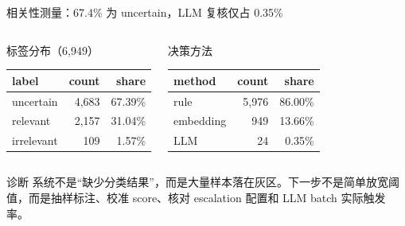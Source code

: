 \begin{frame}{相关性测量：67.4\% 为 uncertain，LLM 复核仅占 0.35\%}
\small
\begin{columns}[T,onlytextwidth]
\begin{block}{标签分布（6,949）}
\begin{tabularx}{0.96\linewidth}{X r r}
\toprule
label & count & share \\
\midrule
uncertain & 4,683 & 67.39\% \\
relevant & 2,157 & 31.04\% \\
irrelevant & 109 & 1.57\% \\
\bottomrule
\end{tabularx}
\end{block}
\begin{block}{决策方法}
\begin{tabularx}{0.96\linewidth}{X r r}
\toprule
method & count & share \\
\midrule
rule & 5,976 & 86.00\% \\
embedding & 949 & 13.66\% \\
LLM & 24 & 0.35\% \\
\bottomrule
\end{tabularx}
\end{block}
\end{columns}

\begin{alertblock}{诊断}
系统不是“缺少分类结果”，而是大量样本落在灰区。下一步不是简单放宽阈值，而是抽样标注、校准 score、核对 escalation 配置和 LLM batch 实际触发率。
\end{alertblock}
\end{frame}

